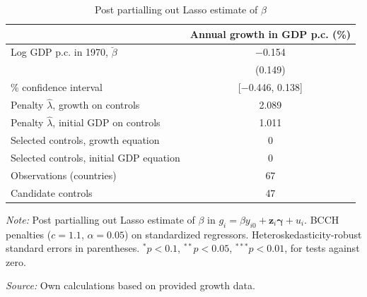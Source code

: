 \begin{table}[!htbp]
\centering
\caption{Post partialling out Lasso estimate of $\beta$}
\label{tab:ppol_estimates}
\begin{threeparttable}
\begin{tabular}{lc}
\toprule
 & Annual growth in GDP p.c. (\%) \\
\midrule
Log GDP p.c. in 1970, $\breve{\beta}$ & $-$0.154 \\
 & (0.149) \\
\addlinespace
95\% confidence interval & [$-$0.446, 0.138] \\
\midrule
Penalty $\hat{\lambda}$, growth on controls & 2.089 \\
Penalty $\hat{\lambda}$, initial GDP on controls & 1.011 \\
Selected controls, growth equation & 0 \\
Selected controls, initial GDP equation & 0 \\
\midrule
Observations (countries) & 67 \\
Candidate controls & 47 \\
\bottomrule
\end{tabular}
\begin{tablenotes}[flushleft]
\footnotesize
\item \textit{Note:} Post partialling out Lasso estimate of $\beta$ in $g_i = \beta y_{i0} + \mathbf{z}_i\boldsymbol{\gamma} + u_i$. BCCH penalties ($c=1.1$, $\alpha=0.05$) on standardized regressors. Heteroskedasticity-robust standard errors in parentheses. $^{*}p<0.1$, $^{**}p<0.05$, $^{***}p<0.01$, for tests against zero.
\item \textit{Source:} Own calculations based on provided growth data.
\end{tablenotes}
\end{threeparttable}
\end{table}